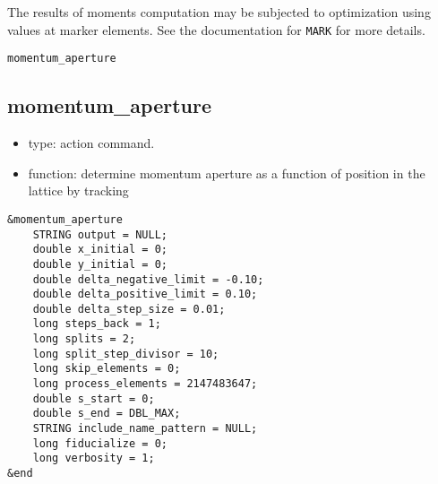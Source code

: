 \documentclass[11pt]{article}
\begin{document}
The results of moments computation may be subjected to optimization
using values at marker elements.  See the documentation for
\verb|MARK| for more details.

\begin{latexonly}
\newpage
\begin{center}{\Large\verb|momentum_aperture|}\end{center}
\end{latexonly}
\subsection{momentum\_aperture \label{subsec:momentumaperture}}

\begin{itemize}
\item type: action command.
\item function: determine momentum aperture as a function of position in the lattice by tracking
\end{itemize}

\begin{verbatim}
&momentum_aperture
    STRING output = NULL;
    double x_initial = 0;
    double y_initial = 0;
    double delta_negative_limit = -0.10;
    double delta_positive_limit = 0.10;
    double delta_step_size = 0.01;
    long steps_back = 1;
    long splits = 2;
    long split_step_divisor = 10;
    long skip_elements = 0;
    long process_elements = 2147483647;
    double s_start = 0;
    double s_end = DBL_MAX;
    STRING include_name_pattern = NULL;
    long fiducialize = 0;
    long verbosity = 1;
&end
\end{verbatim}
\end{document}
